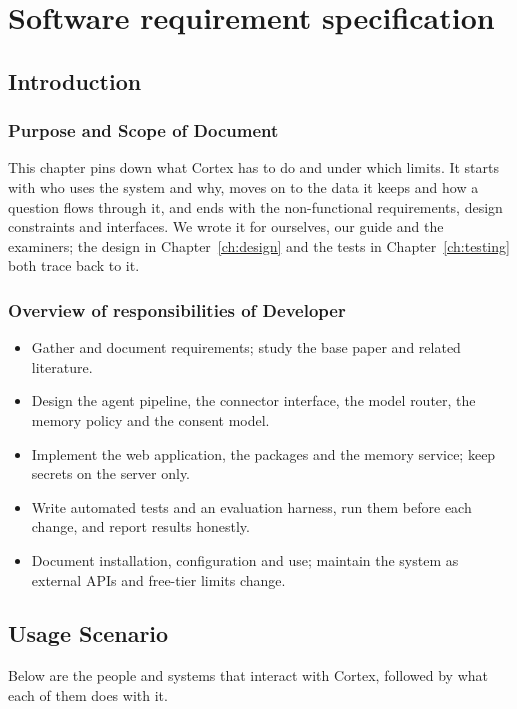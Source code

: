 \documentclass[oneside,a4paper,12pt]{report}
\begin{document}
\chapter{Software requirement specification  }

\section{Introduction}
\subsection{Purpose and Scope of Document}
This chapter pins down what Cortex has to do and under which limits. It starts with who uses the system and why, moves on to the data it keeps and how a question flows through it, and ends with the non-functional requirements, design constraints and interfaces. We wrote it for ourselves, our guide and the examiners; the design in Chapter~\ref{ch:design} and the tests in Chapter~\ref{ch:testing} both trace back to it.

\subsection{Overview of responsibilities of Developer}
\begin{itemize}
\item Gather and document requirements; study the base paper and related literature.
\item Design the agent pipeline, the connector interface, the model router, the memory policy and the consent model.
\item Implement the web application, the packages and the memory service; keep secrets on the server only.
\item Write automated tests and an evaluation harness, run them before each change, and report results honestly.
\item Document installation, configuration and use; maintain the system as external APIs and free-tier limits change.
\end{itemize}

\section{Usage Scenario}
Below are the people and systems that interact with Cortex, followed by what each of them does with it.
\end{document}
